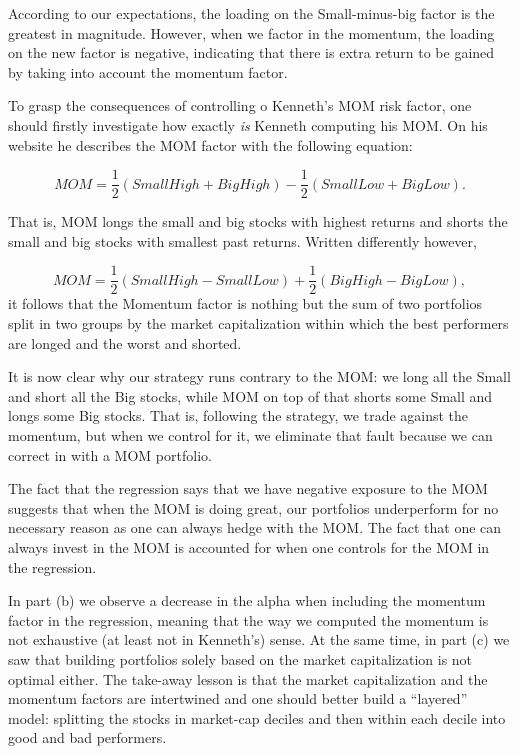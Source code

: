\documentclass[10pt]{article}
\begin{document}
According to our expectations, the loading on the Small-minus-big factor is the
greatest in magnitude. However, when we factor in the momentum, the loading on
the new factor is negative, indicating that there is extra return to
be gained by taking into account the momentum factor.

To grasp the consequences of controlling o Kenneth's MOM risk factor, one should
firstly investigate how exactly \textit{is} Kenneth computing his MOM. On his website he
describes the MOM factor with the following equation:

\begin{equation}
  MOM = \frac{1}{2} \left( Small High + Big High \right) - \frac{1}{2}\left(
    Small Low + Big Low \right).
  \end{equation}

  That is, MOM longs the small and big stocks with highest returns and
  shorts the small and big stocks with smallest past returns. Written
  differently however,

  \begin{equation}
  MOM = \frac{1}{2} \left( Small High - Small Low \right) + \frac{1}{2}\left(
    Big High - Big Low \right),
  \end{equation}
  it follows that the Momentum factor is nothing but the sum of two portfolios split in two
  groups by the market capitalization within which the best performers are
  longed and the worst and shorted.

  It is now clear why our strategy runs contrary to the MOM: we long all the
  Small and short all the Big stocks, while MOM on top of that shorts some Small
  and longs some 
  Big stocks. That is, following the strategy, we trade against the momentum,
  but when we control for it, we eliminate that fault because we can correct in
  with a MOM portfolio.

  The fact that the regression says that we have negative exposure to the MOM
  suggests that when the MOM is doing great, our portfolios underperform for no
  necessary reason as one can always hedge with the MOM. The
  fact that one can always invest in the MOM is accounted for when one controls
  for the MOM in the regression.

  In part (b) we observe a decrease in the alpha when including the
  momentum factor in the regression, meaning that the way we computed the
  momentum is not exhaustive (at least not in Kenneth's) sense. At the same time,
  in part (c) we saw that building portfolios solely based on the market
  capitalization is not optimal either. The take-away lesson is that the market
  capitalization and the momentum factors are intertwined and one should better
  build a ``layered'' model: splitting the stocks in market-cap deciles and then
  within each decile into good and bad performers.

   
\end{document}
